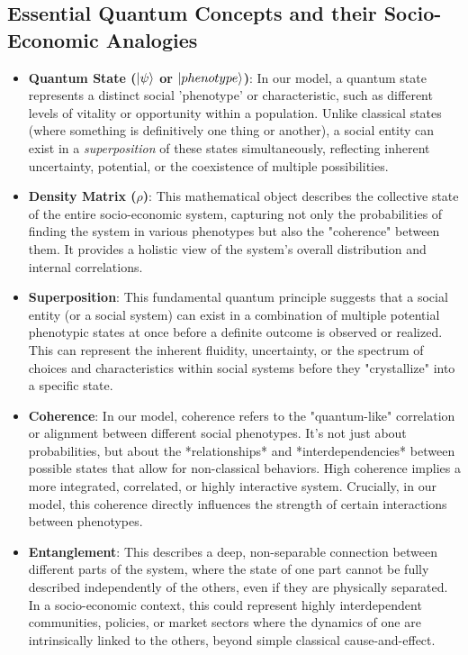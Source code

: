 \documentclass[9pt]{article}
\begin{document}
\subsection{Essential Quantum Concepts and their Socio-Economic Analogies}
\begin{itemize}
    \item \textbf{Quantum State ($\ket{\psi}$ or $\ket{phenotype}$)}: In our model, a quantum state represents a distinct social 'phenotype' or characteristic, such as different levels of vitality or opportunity within a population. Unlike classical states (where something is definitively one thing or another), a social entity can exist in a \textit{superposition} of these states simultaneously, reflecting inherent uncertainty, potential, or the coexistence of multiple possibilities.
    \item \textbf{Density Matrix ($\rho$)}: This mathematical object describes the collective state of the entire socio-economic system, capturing not only the probabilities of finding the system in various phenotypes but also the "coherence" between them. It provides a holistic view of the system's overall distribution and internal correlations.
    \item \textbf{Superposition}: This fundamental quantum principle suggests that a social entity (or a social system) can exist in a combination of multiple potential phenotypic states at once before a definite outcome is observed or realized. This can represent the inherent fluidity, uncertainty, or the spectrum of choices and characteristics within social systems before they "crystallize" into a specific state.
    \item \textbf{Coherence}: In our model, coherence refers to the "quantum-like" correlation or alignment between different social phenotypes. It's not just about probabilities, but about the *relationships* and *interdependencies* between possible states that allow for non-classical behaviors. High coherence implies a more integrated, correlated, or highly interactive system. Crucially, in our model, this coherence directly influences the strength of certain interactions between phenotypes.
    \item \textbf{Entanglement}: This describes a deep, non-separable connection between different parts of the system, where the state of one part cannot be fully described independently of the others, even if they are physically separated. In a socio-economic context, this could represent highly interdependent communities, policies, or market sectors where the dynamics of one are intrinsically linked to the others, beyond simple classical cause-and-effect.

\end{itemize}
\end{document}

